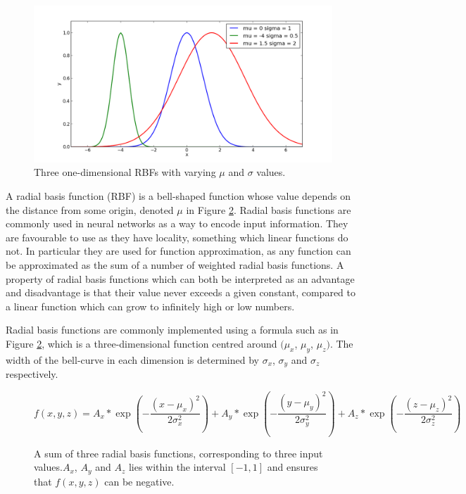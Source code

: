 \documentclass[a4paper,11pt]{kth-mag}
\begin{document}
\begin{figure}
\centering\includegraphics[scale=0.5]{rbf_1d.png}
\caption{Three one-dimensional RBFs with varying $\mu$ and $\sigma$ values.}
\label{3-RBF-functions}
\end{figure}

A radial basis function (RBF) is a bell-shaped function whose value depends on the distance from some origin\cite[p.~1-8]{buhmann}, denoted $\mu$ in Figure \ref{RBF-1}.  Radial basis functions are commonly used in neural networks as a way to encode input information. They are favourable to use as they have locality, something which linear functions do not. In particular they are used for function approximation, as any function can be approximated as the sum of a number of weighted radial basis functions. A property of radial basis functions which can both be interpreted as an advantage and disadvantage is that their value never exceeds a given constant, compared to a linear function which can grow to infinitely high or low numbers.

Radial basis functions are commonly implemented using a formula such as in Figure \ref{RBF-1}, which is a three-dimensional function centred around $(\mu _{x}$, $\mu _{y}$, $\mu _{z})$. The width of the bell-curve in each dimension is determined by $\sigma _{x}$, $\sigma _{y}$ and $\sigma _{z}$ respectively.

\begin{figure}
\begin{equation}
f(x,y,z) = A_x*\exp(-\frac{(x-\mu_{x})^{2}}{2 \sigma _{x}^{2}}) + A_y*\exp(-\frac{(y-\mu_{y})^{2}}{2 \sigma _{y}^{2}}) + A_z*\exp(-\frac{(z-\mu_{z})^{2}}{2 \sigma _{z}^{2}})
\end{equation}
\caption{A sum of three radial basis functions, corresponding to three input values.$A_x$, $A_y$ and $A_z$ lies within the interval $[-1,1]$ and ensures that $f(x,y,z)$ can be negative.}
\label{RBF-1}
\end{figure}
\end{document}
